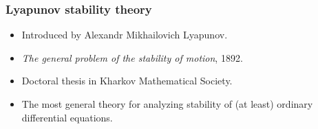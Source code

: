 \begin{frame}
    \frametitle{Lyapunov stability theory}

    

    \begin{itemize}
        \item Introduced by Alexandr Mikhailovich Lyapunov.
        \item \textit{The general problem of the stability of motion}, 1892.
        \item Doctoral thesis in Kharkov Mathematical Society.
        \item The most general theory for analyzing stability of (at least)
        ordinary differential equations.
    \end{itemize}

\end{frame}
